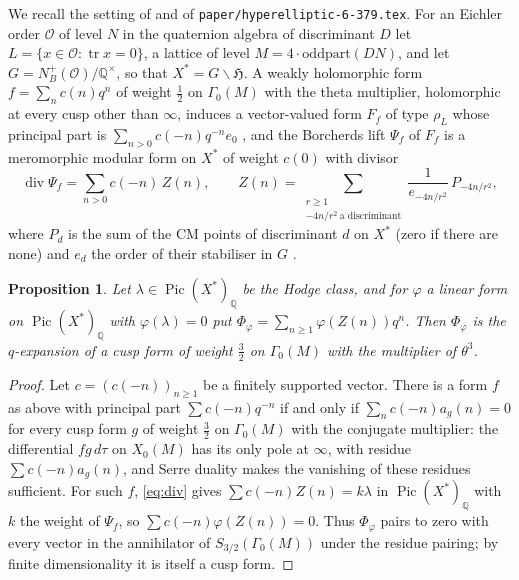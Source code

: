 \documentclass[11pt,reqno]{amsart}
\theoremstyle{plain}
\newtheorem{proposition}[theorem]{Proposition}
\theoremstyle{definition}
\DeclareMathOperator{\Pic}{Pic}
\DeclareMathOperator{\tr}{tr}
\newcommand{\Q}{\mathbb{Q}}
\newcommand{\HH}{\mathfrak{H}}
\newcommand{\cO}{\mathcal{O}}
\begin{document}
We recall the setting of \cite{gy} and of \texttt{paper/hyperelliptic-6-379.tex}. For an Eichler
order $\cO$ of level $N$ in the quaternion algebra of discriminant $D$ let $L=\{x\in\cO:\tr x=0\}$,
a lattice of level $M=4\cdot\mathrm{oddpart}(DN)$, and let $G=N_B^+(\cO)/\Q^\times$, so that
$X^*=G\backslash\HH$. A weakly holomorphic form $f=\sum_nc(n)q^n$ of weight $\tfrac12$ on
$\Gamma_0(M)$ with the theta multiplier, holomorphic at every cusp other than $\infty$, induces a
vector-valued form $F_f$ of type $\rho_L$ whose principal part is $\sum_{n>0}c(-n)q^{-n}e_0$
\cite[Lemmas 10 and 24]{gy}, and the Borcherds lift $\Psi_f$ of $F_f$ is a meromorphic modular form
on $X^*$ of weight $c(0)$ with divisor
\begin{equation}\label{eq:div}
\operatorname{div}\Psi_f=\sum_{n>0}c(-n)\,Z(n),\qquad
Z(n)=\sum_{\substack{r\ge1\\ -4n/r^2\ \text{a discriminant}}}\frac1{e_{-4n/r^2}}\,P_{-4n/r^2},
\end{equation}
where $P_d$ is the sum of the CM points of discriminant $d$ on $X^*$ (zero if there are none) and
$e_d$ the order of their stabiliser in $G$ \cite[Lemmas 22 and 25]{gy}.

\begin{proposition}\label{prop:dual}
Let $\lambda\in\Pic(X^*)_\Q$ be the Hodge class, and for $\varphi$ a linear form on $\Pic(X^*)_\Q$
with $\varphi(\lambda)=0$ put $\Phi_\varphi=\sum_{n\ge1}\varphi(Z(n))q^n$. Then $\Phi_\varphi$ is the
$q$-expansion of a cusp form of weight $\tfrac32$ on $\Gamma_0(M)$ with the multiplier of
$\theta^3$.
\end{proposition}

\begin{proof}
Let $c=(c(-n))_{n\ge1}$ be a finitely supported vector. There is a form $f$ as above with principal
part $\sum c(-n)q^{-n}$ if and only if $\sum_nc(-n)a_g(n)=0$ for every cusp form $g$ of weight
$\tfrac32$ on $\Gamma_0(M)$ with the conjugate multiplier: the differential $fg\,d\tau$ on $X_0(M)$
has its only pole at $\infty$, with residue $\sum c(-n)a_g(n)$, and Serre duality makes the
vanishing of these residues sufficient. For such $f$, \eqref{eq:div} gives $\sum c(-n)Z(n)=k\lambda$
in $\Pic(X^*)_\Q$ with $k$ the weight of $\Psi_f$, so $\sum c(-n)\varphi(Z(n))=0$. Thus
$\Phi_\varphi$ pairs to zero with every vector in the annihilator of $S_{3/2}(\Gamma_0(M))$ under
the residue pairing; by finite dimensionality it is itself a cusp form.
\end{proof}
\end{document}
